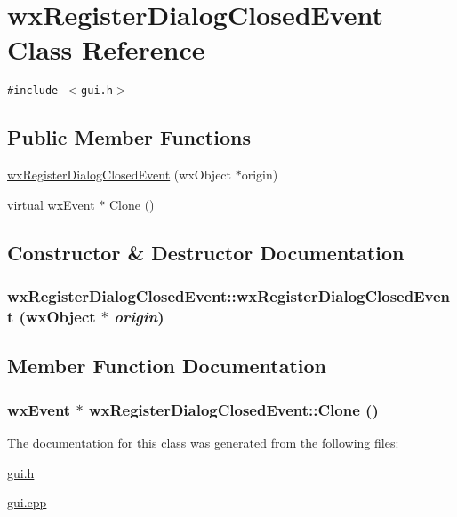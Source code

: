 \hypertarget{classwxRegisterDialogClosedEvent}{
\section{wxRegisterDialogClosedEvent Class Reference}
\label{classwxRegisterDialogClosedEvent}
}
{\tt \#include $<$gui.h$>$}

\subsection*{Public Member Functions}
\begin{CompactItemize}
\item 
\hyperlink{classwxRegisterDialogClosedEvent_278f2b13aa9b5768d3b0f21de2ef6962}{wxRegisterDialogClosedEvent} (wxObject $\ast$origin)
\item 
virtual wxEvent $\ast$ \hyperlink{classwxRegisterDialogClosedEvent_f49e7ab28e7de6b258c2fa774ab5a210}{Clone} ()
\end{CompactItemize}


\subsection{Constructor \& Destructor Documentation}
\hypertarget{classwxRegisterDialogClosedEvent_278f2b13aa9b5768d3b0f21de2ef6962}{
\subsubsection[{wxRegisterDialogClosedEvent}]{\setlength{\rightskip}{0pt plus 5cm}wxRegisterDialogClosedEvent::wxRegisterDialogClosedEvent (wxObject $\ast$ {\em origin})}}
\label{classwxRegisterDialogClosedEvent_278f2b13aa9b5768d3b0f21de2ef6962}




\subsection{Member Function Documentation}
\hypertarget{classwxRegisterDialogClosedEvent_f49e7ab28e7de6b258c2fa774ab5a210}{
\subsubsection[{Clone}]{\setlength{\rightskip}{0pt plus 5cm}wxEvent $\ast$ wxRegisterDialogClosedEvent::Clone ()}}
\label{classwxRegisterDialogClosedEvent_f49e7ab28e7de6b258c2fa774ab5a210}




The documentation for this class was generated from the following files:\begin{CompactItemize}
\item 
\hyperlink{gui_8h}{gui.h}\item 
\hyperlink{gui_8cpp}{gui.cpp}\end{CompactItemize}
